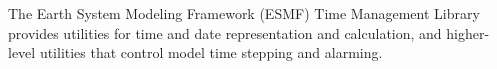 

The Earth System Modeling Framework (ESMF) Time Management Library
provides utilities for time and date representation and calculation,
and higher-level utilities that control model time stepping and alarming.

